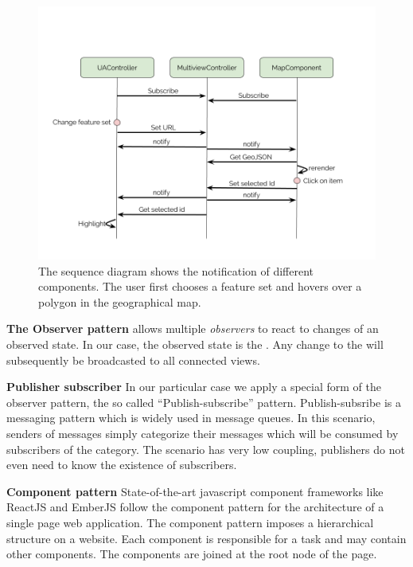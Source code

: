 \begin{figure}[ht]
  \centering
  \includegraphics[width=\textwidth]{images/sequence-diagram.png}
  \caption{%
    The sequence diagram shows the notification of different components.
  The user first chooses a feature set and hovers over a polygon in the geographical map.
  }\label{fig:implementation:sequence-diagram}
\end{figure}


\textbf{The Observer pattern} allows multiple \emph{observers} to react to changes of an observed state.
In our case, the observed state is the .
Any change to the  will subsequently be broadcasted to all connected views.


\textbf{Publisher subscriber}
In our particular case we apply a special form of the observer pattern, the so called ``Publish-subscribe'' pattern\cite{Eugster2003}.
Publish-subsribe is a messaging pattern which is widely used in message queues.
In this scenario, senders of messages simply categorize their messages which will be consumed by subscribers of the category.
The scenario has very low coupling, publishers do not even need to know the existence of subscribers.

\textbf{Component pattern}
State-of-the-art javascript component frameworks like ReactJS and EmberJS follow the component pattern for the architecture of a single page web application.
The component pattern imposes a hierarchical structure on a website.
Each component is responsible for a task and may contain other components.
The components are joined at the root node of the page.

